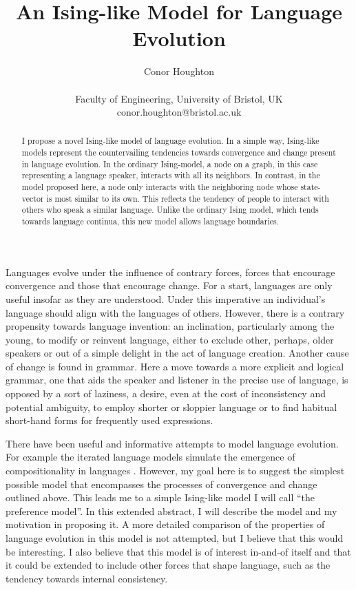 \documentclass[letterpaper]{article}
\title{An Ising-like Model for Language Evolution}
\author{Conor Houghton \\
\mbox{}\\
Faculty of Engineering, University of Bristol, UK\\
conor.houghton@bristol.ac.uk} %
\begin{document}
\maketitle

\begin{abstract}
I propose a novel Ising-like model of language evolution. In a simple way, Ising-like models represent the countervailing tendencies towards convergence and change present in language evolution. In the ordinary Ising-model, a node on a graph, in this case representing a language speaker, interacts with all its neighbors. In contrast, in the model proposed here, a node only interacts with the neighboring node whose state-vector is most similar to its own. This reflects the tendency of people to interact with others who speak a similar language. Unlike the ordinary Ising model, which tends towards language continua, this new model allows language boundaries. 
\end{abstract}

Languages evolve under the influence of contrary forces, forces that encourage convergence and those that encourage change. For a start, languages are only useful insofar as they are understood. Under this imperative an individual's language should align with the languages of others. However, there is a contrary propensity towards language invention: an inclination, particularly among the young, to modify or reinvent language, either to exclude other, perhaps, older speakers or out of a simple delight in the act of language creation. Another cause of change is found in grammar. Here a move towards a more explicit and logical grammar, one that aids the speaker and listener in the precise use of language, is opposed by a sort of laziness, a desire, even at the cost of inconsistency and potential ambiguity, to employ shorter or sloppier language or to find habitual short-hand forms for frequently used expressions. 

There have been useful and informative attempts to model language evolution. For example the iterated language models simulate the emergence of compositionality in languages \citep{KirbyHurford,BraceBullock}. However, my goal here is to suggest the simplest possible model that encompasses the processes of convergence and change outlined above. This leads me to a simple Ising-like model I will call ``the preference model''. In this extended abstract, I will describe the model and my motivation in proposing it. A more detailed comparison of the properties of language evolution in this model is not attempted, but I believe that this would be interesting. I also believe that this model is of interest in-and-of itself and that it could be extended to include other forces that shape language, such as the tendency towards internal consistency.
\end{document}
